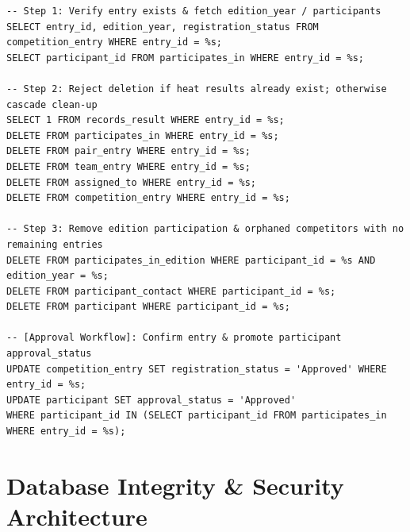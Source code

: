 \documentclass[11pt,a4paper]{article}
\begin{document}
\begin{lstlisting}
-- Step 1: Verify entry exists & fetch edition_year / participants
SELECT entry_id, edition_year, registration_status FROM competition_entry WHERE entry_id = %s;
SELECT participant_id FROM participates_in WHERE entry_id = %s;

-- Step 2: Reject deletion if heat results already exist; otherwise cascade clean-up
SELECT 1 FROM records_result WHERE entry_id = %s;
DELETE FROM participates_in WHERE entry_id = %s;
DELETE FROM pair_entry WHERE entry_id = %s;
DELETE FROM team_entry WHERE entry_id = %s;
DELETE FROM assigned_to WHERE entry_id = %s;
DELETE FROM competition_entry WHERE entry_id = %s;

-- Step 3: Remove edition participation & orphaned competitors with no remaining entries
DELETE FROM participates_in_edition WHERE participant_id = %s AND edition_year = %s;
DELETE FROM participant_contact WHERE participant_id = %s;
DELETE FROM participant WHERE participant_id = %s;

-- [Approval Workflow]: Confirm entry & promote participant approval_status
UPDATE competition_entry SET registration_status = 'Approved' WHERE entry_id = %s;
UPDATE participant SET approval_status = 'Approved' 
WHERE participant_id IN (SELECT participant_id FROM participates_in WHERE entry_id = %s);
\end{lstlisting}

\vspace{0.2em}

\section{Database Integrity \& Security Architecture}
\end{document}

